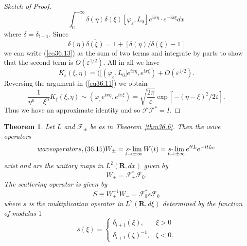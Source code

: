 \documentclass{surv-l}
\theoremstyle{plain}
\newtheorem{theorem}{Theorem}[section]
\theoremstyle{definition}
\numberwithin{equation}{chapter}
\begin{document}
\begin{proof}[Sketch of Proof]
\begin{equation}\label{eq36.13}
\int_{0}^{-\infty}\delta(\eta)\overline{\delta(\xi)}[\varphi_{\varepsilon}, L_{0}]e^{ix\eta}\cdot e^{-ix\xi}dx
\end{equation}
where $\delta=\delta_{l+1}$. Since
\begin{equation*}
\delta(\eta)\overline{\delta(\xi)}=1+[\delta(\eta)/\delta(\xi)-1]
\end{equation*}
we can write (\ref{eq36.13}) as the sum of two terms and integrate by parts to show that the second term is $O(\varepsilon^{1/2})$. All in all we have
\begin{equation*}
K_{\varepsilon}(\xi,\eta)=([(\varphi_{\varepsilon}, L_{0}]e^{ix\eta}, e^{ix\xi})+O(\varepsilon^{1/2}).
\end{equation*}
Reversing the argument in (\ref{eq36.11}) we obtain
\begin{equation*}
\frac{1}{\eta^{n}-\xi^{n}}K_{\xi}(\xi, \eta)\sim(\varphi_{\varepsilon}e^{ix\eta}, e^{ix\xi})=\sqrt{\frac{2\pi}{\varepsilon}}\exp[-(\eta-\xi)^{2}/2\varepsilon].
\end{equation*}
Thus we have an approximate identity and so $\mathscr{F}\!\!\mathscr{F}^{*}=I$.
\end{proof}
\setcounter{theorem}{13}
\begin{theorem}\label{thm36.14}
Let $L$ and $\mathscr{F}_{\pm}$ be as in Theorem~\emph{\ref{thm36.6}}. Then the wave operators
\setcounter{equation}{14}
\begin{equation}\label{eq36.15}\index{subject}{wave operators, (36.15)}
W_{\pm}=\mathop{s\text{-}\lim}_{t\rightarrow\pm\infty}W(t)=\mathop{s\text{-}\lim}_{t\rightarrow\pm\infty}e^{itL}e^{-itL_{0}}
\end{equation}
exist and are the unitary maps in $L^{2}(\mathbf{R}, dx)$ given by
\begin{equation}\label{eq36.16}
W_{\pm}=\mathscr{F}_{\pm}^{*}\mathscr{F}_{0}.
\end{equation}
The scattering operator is given by
\begin{equation}\label{eq36.17}
S\equiv W_{+}^{-1}W_{-}=\mathscr{F}_{0}^{*}s\mathscr{F}_{0}
\end{equation}
where $s$ is the multiplication operator in $L^{2} (\mathbf{R}, d\xi)$ determined by the function of modulus $1$
\begin{equation}\label{eq36.18}
s(\xi)=\left\{\begin{array}{ll}
\delta_{l+1}(\xi), & \xi>0\\
\delta_{l+1}(\xi)^{-1}, & \xi<0.
\end{array}\right.
\end{equation}
\end{theorem}
\end{document}

